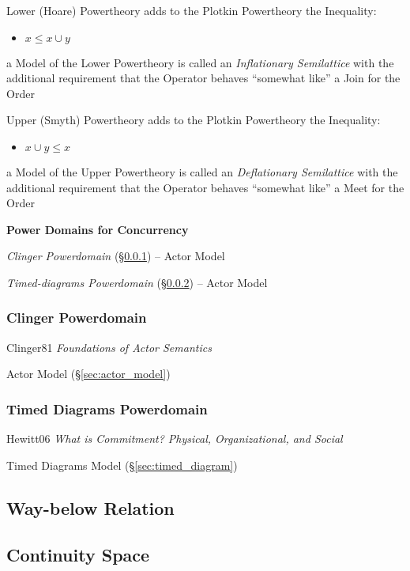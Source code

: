 Lower (Hoare) Powertheory adds to the Plotkin Powertheory the
Inequality:
\begin{itemize}
  \item $x \leq x \cup y$
\end{itemize}
a Model of the Lower Powertheory is called an \emph{Inflationary
  Semilattice} with the additional requirement that the Operator
behaves ``somewhat like'' a Join for the Order %

Upper (Smyth) Powertheory adds to the Plotkin Powertheory the
Inequality:
\begin{itemize}
  \item $x \cup y \leq x$
\end{itemize}
a Model of the Upper Powertheory is called an \emph{Deflationary
  Semilattice} with the additional requirement that the Operator
behaves ``somewhat like'' a Meet for the Order %


\textbf{Power Domains for Concurrency}

\emph{Clinger Powerdomain} (\S\ref{sec:clinger_powerdomain}) -- Actor
Model

\emph{Timed-diagrams Powerdomain}
(\S\ref{sec:timed_diagrams_powerdomain}) -- Actor Model



\subsubsection{Clinger Powerdomain}\label{sec:clinger_powerdomain}

Clinger81 \emph{Foundations of Actor Semantics}

\fist Actor Model (\S\ref{sec:actor_model})



\subsubsection{Timed Diagrams Powerdomain}
\label{sec:timed_diagrams_powerdomain}

Hewitt06 \emph{What is Commitment? Physical, Organizational, and
  Social}

\fist Timed Diagrams Model (\S\ref{sec:timed_diagram})



\subsection{Way-below Relation}\label{sec:waybelow_relation}

\subsection{Continuity Space}\label{sec:continuity_space}
